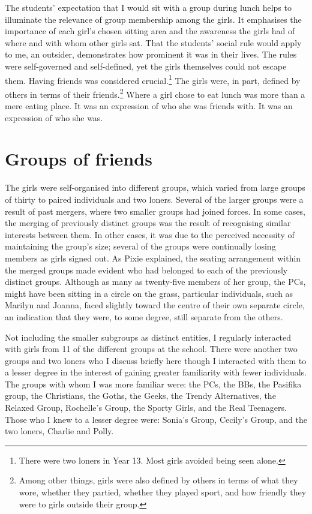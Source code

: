 The students' expectation that I would sit with a group during lunch helps to illuminate the relevance of group membership among the girls.  It emphasises the importance of each girl's chosen sitting area and the awareness the girls had of where and with whom other girls sat.  That the students' social rule would apply to me, an outsider, demonstrates how prominent it was in their lives.  The rules were self-governed and self-defined, yet the girls themselves could not escape them.  Having friends was considered crucial.\footnote{There were two loners in Year 13.  Most girls avoided being seen alone.}  The girls were, in part, defined by others in terms of their friends.\footnote{Among other things, girls were also defined by others in terms of what they wore, whether they partied, whether they played sport, and how friendly they were to girls outside their group.}  Where a girl chose to eat lunch was more than a mere eating place.  It was an expression of who she was friends with.  It was an expression of who she was.



\section{Groups of friends}\label{lunchlocale}

The girls were self-organised into different groups, which varied from large groups of thirty to paired individuals and two loners.  Several of the larger groups were a result of past mergers, where two smaller groups had joined forces.  In some cases, the merging of previously distinct groups was the result of recognising similar interests between them.  In other cases, it was due to the perceived necessity of maintaining the group's size; several of the groups were continually losing members as girls signed out.  As Pixie explained, the seating arrangement within the merged groups made evident who had belonged to each of the previously distinct groups.  Although as many as twenty-five members of her group, the PCs, might have been sitting in a circle on the grass, particular individuals, such as Marilyn and Joanna, faced slightly toward the centre of their own separate circle, an indication that they were, to some degree, still separate from the others.  


Not including the smaller subgroups as distinct entities, I regularly interacted with girls from 11 of the different groups at the school.  There were another two groups and two loners who I discuss briefly here though I interacted with them to a lesser degree in the interest of gaining greater familiarity with fewer individuals.  The groups with whom I was more familiar were: the PCs, the BBs, the Pasifika group, the Christians, the Goths, the Geeks, the Trendy Alternatives, the Relaxed Group, Rochelle's Group, the Sporty Girls, and the Real Teenagers.  Those who I knew to a lesser degree were: Sonia's Group, Cecily's Group, and the two loners, Charlie and Polly.  

